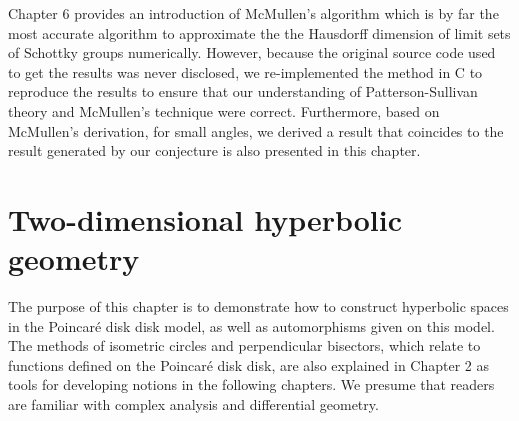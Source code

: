 \documentclass[12pt,oneside]{sfsuthesis}
\theoremstyle{plain} %
\theoremstyle{definition}  %
\theoremstyle{remark}  %
\theoremstyle{plain}
\begin{document}
{Chapter 6 provides an introduction of McMullen's algorithm which is by far the most accurate algorithm to approximate the the Hausdorff dimension of limit sets of Schottky groups numerically. However, because the original source code used to get the results was never disclosed, we re-implemented the method in C to reproduce the results to ensure that our understanding of Patterson-Sullivan theory and McMullen's technique were correct. Furthermore, based on McMullen's derivation, for small angles, we derived a result that coincides to the result generated by our conjecture is also presented in this chapter.












\chapter{Two-dimensional hyperbolic geometry}


The purpose of this chapter is to demonstrate how to construct hyperbolic spaces in the Poincar\'{e} disk disk model, as well as automorphisms given on this model. The methods of isometric circles and perpendicular bisectors, which relate to functions defined on the Poincar\'{e} disk disk, are also explained in Chapter 2 as tools for developing notions in the following chapters. We presume that readers are familiar with complex analysis and differential geometry.

}
\end{document}
